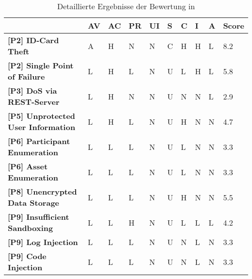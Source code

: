 \begin{sidewaystable}[ph!]
\centering
\sffamily
\begin{tabularx}{\textwidth}{|l|X|X|X|X|X|X|X|X|l|}
\hline
\textbf{}                                      & \textbf{AV} & \textbf{AC} & \textbf{PR} & \textbf{UI} & \textbf{S} & \textbf{C} & \textbf{I} & \textbf{A} & \textbf{Score} \\ \hline
\textbf{{[}P2{]} ID-Card Theft}                & A           & H           & N           & N           & C          & H          & H          & L          & 8.2            \\ \hline
\textbf{{[}P2{]} Single Point of Failure}      & L           & H           & L           & N           & U          & L          & H          & L          & 5.8            \\ \hline
\textbf{{[}P3{]} DoS via REST-Server}          & L           & H           & N           & N           & U          & N          & N          & L          & 2.9            \\ \hline
\textbf{{[}P5{]} Unprotected User Information} & L           & H           & L           & N           & U          & H          & N          & N          & 4.7            \\ \hline
\textbf{{[}P6{]} Participant Enumeration}      & L           & L           & L           & N           & U          & L          & N          & N          & 3.3            \\ \hline
\textbf{{[}P6{]} Asset Enumeration}            & L           & L           & L           & N           & U          & L          & N          & N          & 3.3            \\ \hline
\textbf{{[}P8{]} Unencrypted Data Storage}     & L           & L           & L           & N           & U          & H          & N          & N          & 5.5            \\ \hline
\textbf{{[}P9{]} Insufficient Sandboxing}      & L           & L           & H           & N           & U          & L          & L          & L          & 4.2            \\ \hline
\textbf{{[}P9{]} Log Injection}                & L           & L           & L           & N           & U          & N          & L          & N          & 3.3            \\ \hline
\textbf{{[}P9{]} Code Injection}               & L           & L           & L           & N           & U          & N          & L          & N          & 3.3            \\ \hline
\end{tabularx}
\caption{Detaillierte Ergebnisse der Bewertung in }
\label{tab:eval_cvss_long}
\end{sidewaystable}


\newpage
